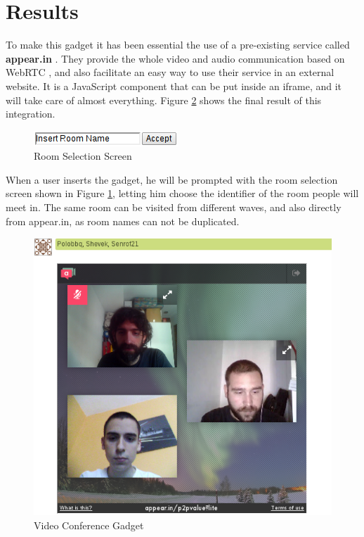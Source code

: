 \section{Results}
To make this gadget it has been essential the use of a pre-existing service called \textbf{appear.in} \cite{ref:appearin}. They provide the whole video and audio communication based on WebRTC \cite{ref:webrtc}, and also facilitate an easy way to use their service in an external website. It is a JavaScript component that can be put inside an iframe, and it will take care of almost everything. Figure \ref{fig:video_gadget} shows the final result of this integration.
\begin{figure}[h]
  \center
    \includegraphics[keepaspectratio, scale=0.8]{Media/Captures/Extensions/VideoGadget/RoomSelection.png}
  \caption{Room Selection Screen}
  \label{fig:video_gadget_room}
\end{figure}
When a user inserts the gadget, he will be prompted with the room selection screen shown in Figure \ref{fig:video_gadget_room}, letting him choose the identifier of the room people will meet in. The same room can be visited from different waves, and also directly from appear.in, as room names can not be duplicated.
\begin{figure}[h]
  \center
    \includegraphics[keepaspectratio, scale=0.45]{Media/Captures/Extensions/VideoGadget.png}
  \caption{Video Conference Gadget}
  \label{fig:video_gadget}
\end{figure}
